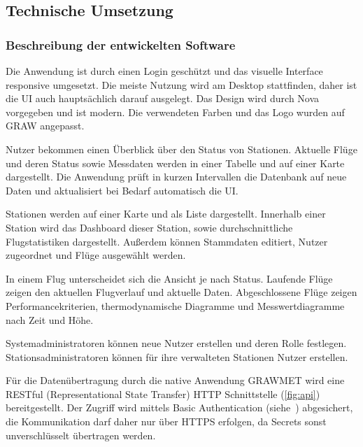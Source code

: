 \subsection{Technische Umsetzung}

\subsubsection{Beschreibung der entwickelten Software}
Die Anwendung ist durch einen Login geschützt und das visuelle Interface responsive umgesetzt.
Die meiste Nutzung wird am Desktop stattfinden, daher ist die UI auch hauptsächlich darauf ausgelegt.
Das Design wird durch Nova vorgegeben und ist modern.
Die verwendeten Farben und das Logo wurden auf GRAW angepasst.

Nutzer bekommen einen Überblick über den Status von Stationen.
Aktuelle Flüge und deren Status sowie Messdaten werden in einer Tabelle und auf einer Karte dargestellt.
Die Anwendung prüft in kurzen Intervallen die Datenbank auf neue Daten und aktualisiert bei Bedarf automatisch die UI.

Stationen werden auf einer Karte und als Liste dargestellt.
Innerhalb einer Station wird das Dashboard dieser Station, sowie durchschnittliche Flugstatistiken dargestellt.
Außerdem können Stammdaten editiert, Nutzer zugeordnet und Flüge ausgewählt werden.

In einem Flug unterscheidet sich die Ansicht je nach Status.
Laufende Flüge zeigen den aktuellen Flugverlauf und aktuelle Daten.
Abgeschlossene Flüge zeigen Performancekriterien, thermodynamische Diagramme und Messwertdiagramme nach Zeit und Höhe.

Systemadministratoren können neue Nutzer erstellen und deren Rolle festlegen.
Stationsadministratoren können für ihre verwalteten Stationen Nutzer erstellen.

\newpage

Für die Datenübertragung durch die native Anwendung GRAWMET wird eine RESTful (Representational State Transfer) HTTP Schnittstelle (\ref{fig:api}) bereitgestellt.
Der Zugriff wird mittels Basic Authentication (siehe~\cite{rfc7235}) abgesichert, die Kommunikation darf daher nur über HTTPS erfolgen, da Secrets sonst unverschlüsselt übertragen werden.

